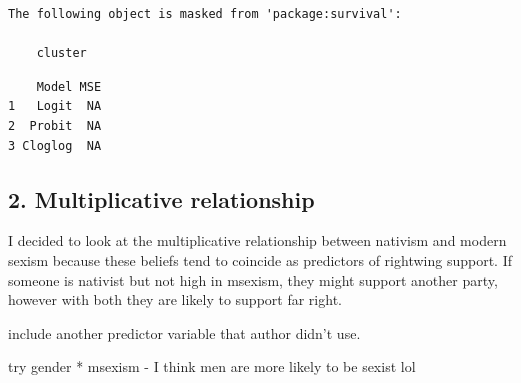 \documentclass[
  letterpaper,
  DIV=11,
  numbers=noendperiod]{scrartcl}
\begin{document}
\begin{verbatim}
The following object is masked from 'package:survival':

    cluster
\end{verbatim}

\begin{verbatim}
    Model MSE
1   Logit  NA
2  Probit  NA
3 Cloglog  NA
\end{verbatim}

\subsection{2. Multiplicative
relationship}\label{multiplicative-relationship}

I decided to look at the multiplicative relationship between nativism
and modern sexism because these beliefs tend to coincide as predictors
of rightwing support. If someone is nativist but not high in msexism,
they might support another party, however with both they are likely to
support far right.

include another predictor variable that author didn't use.

try gender * msexism - I think men are more likely to be sexist lol
\end{document}
